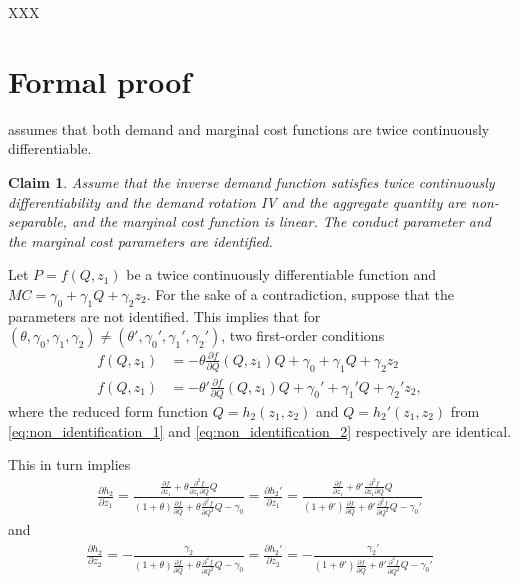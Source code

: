 \documentclass[11pt, a4paper]{article}
\newtheorem{claim}{Claim}
\begin{document}
XXX

\appendix


\section{Formal proof}
\citet{lau1982identifying} assumes that both demand and marginal cost functions are twice continuously differentiable.

\begin{claim}
Assume that the inverse demand function satisfies twice continuously differentiability and the demand rotation IV and the aggregate quantity are non-separable, and the marginal cost function is linear. The conduct parameter and the marginal cost parameters are identified.
\end{claim}

Let $P = f(Q,z_1)$ be a twice continuously differentiable function and $MC = \gamma_0 + \gamma_1 Q + \gamma_2 z_2$.
For the sake of a contradiction, suppose that the parameters are not identified. This implies that for $(\theta, \gamma_0, \gamma_1, \gamma_2)\ne (\theta', \gamma_0', \gamma_1', \gamma_2')$, two first-order conditions
\begin{align}
    f(Q,z_1) &= - \theta \frac{\partial f}{\partial Q}(Q,z_1) Q + \gamma_0 + \gamma_1 Q + \gamma_2 z_2 \label{eq:non_identification_1}\\
    f(Q,z_1) &= - \theta' \frac{\partial f}{\partial Q}(Q,z_1) Q + \gamma_0' + \gamma_1' Q + \gamma_2' z_2 \label{eq:non_identification_2},
\end{align}
where the reduced form function $Q= h_2(z_1,z_2)$ and $Q= h_2'(z_1,z_2)$ from \eqref{eq:non_identification_1} and \eqref{eq:non_identification_2} respectively are identical.

This in turn implies
\begin{align}\label{eq:equivalence_1}
    \frac{\partial h_2}{\partial z_1} = \frac{\frac{\partial f}{\partial z_1} + \theta \frac{\partial^2 f}{\partial z_1\partial Q}Q}{(1 + \theta)\frac{\partial f}{\partial Q} + \theta \frac{\partial^2 f}{\partial Q^2}Q - \gamma_0} = \frac{\partial h_2'}{\partial z_1} = \frac{\frac{\partial f}{\partial z_1} + \theta' \frac{\partial^2 f}{\partial z_1\partial Q}Q}{(1 + \theta')\frac{\partial f}{\partial Q} + \theta' \frac{\partial^2 f}{\partial Q^2}Q - \gamma_0'}
\end{align}
and 
\begin{align}\label{eq:equivalence_2}
    \frac{\partial h_2}{\partial z_2} = -\frac{\gamma_2}{(1 + \theta)\frac{\partial f}{\partial Q} + \theta \frac{\partial^2 f}{\partial Q^2}Q - \gamma_0} = \frac{\partial h_2'}{\partial z_2} = -\frac{\gamma_2'}{(1 + \theta')\frac{\partial f}{\partial Q} + \theta' \frac{\partial^2 f}{\partial Q^2}Q - \gamma_0'}
\end{align}
\end{document}
